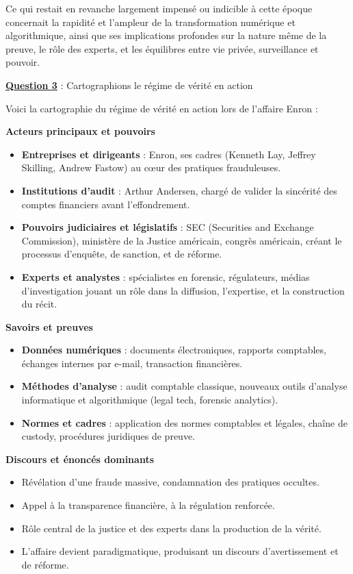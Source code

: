 \documentclass[12pt, a4paper]{article}
\newcommand{\question}[1]{\textbf{\underline{Question #1}}}
\begin{document}
\begin{enumerate}[label=\textbf{\arabic*.}]
		Ce qui restait en revanche largement impensé ou indicible à cette époque concernait la rapidité et l'ampleur de la transformation numérique et algorithmique, ainsi que ses implications profondes sur la nature même de la preuve, le rôle des experts, et les équilibres entre vie privée, surveillance et pouvoir.
		
		\question{3} : Cartographions le régime de vérité en action
		
		Voici la cartographie du régime de vérité en action lors de l'affaire Enron :
		
		\textbf{Acteurs principaux et pouvoirs}
		\begin{itemize}
			\item \textbf{Entreprises et dirigeants} : Enron, ses cadres (Kenneth Lay, Jeffrey Skilling, Andrew Fastow) au cœur des pratiques frauduleuses.
			\item \textbf{Institutions d'audit} : Arthur Andersen, chargé de valider la sincérité des comptes financiers avant l'effondrement.
			\item \textbf{Pouvoirs judiciaires et législatifs} : SEC (Securities and Exchange Commission), ministère de la Justice américain, congrès américain, créant le processus d'enquête, de sanction, et de réforme.
			\item \textbf{Experts et analystes} : spécialistes en forensic, régulateurs, médias d'investigation jouant un rôle dans la diffusion, l'expertise, et la construction du récit.
		\end{itemize}
		
		\textbf{Savoirs et preuves}
		\begin{itemize}
			\item \textbf{Données numériques} : documents électroniques, rapports comptables, échanges internes par e-mail, transaction financières.
			\item \textbf{Méthodes d'analyse} : audit comptable classique, nouveaux outils d'analyse informatique et algorithmique (legal tech, forensic analytics).
			\item \textbf{Normes et cadres} : application des normes comptables et légales, chaîne de custody, procédures juridiques de preuve.
		\end{itemize}
		
		\textbf{Discours et énoncés dominants}
		\begin{itemize}
			\item Révélation d'une fraude massive, condamnation des pratiques occultes.
			\item Appel à la transparence financière, à la régulation renforcée.
			\item Rôle central de la justice et des experts dans la production de la vérité.
			\item L'affaire devient paradigmatique, produisant un discours d'avertissement et de réforme.
		\end{itemize}
		

\end{enumerate}
\end{document}

